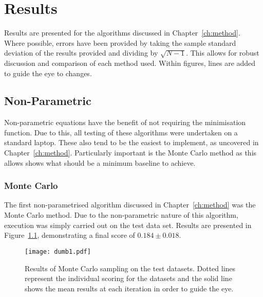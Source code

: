 \chapter{Results}










\graphicspath{{Chapter4/Figs/Vector/}{Chapter4/Figs/}}
Results are presented for the algorithms discussed in Chapter~\ref{ch:method}. Where possible, errors have been provided by taking the sample standard deviation of the results provided and dividing by $\sqrt{N-1}$. This allows for robust discussion and comparison of each method used. Within figures, lines are added to guide the eye to changes.

\section{Non-Parametric}
Non-parametric equations have the benefit of not requiring the minimisation function. Due to this, all testing of these algorithms were undertaken on a standard laptop. These also tend to be the easiest to implement, as uncovered in Chapter~\ref{ch:method}. Particularly important is the Monte Carlo method as this allows shows what should be a minimum baseline to achieve.

\subsection{Monte Carlo}
The first non-parametrised algorithm discussed in Chapter~\ref{ch:method} was the Monte Carlo method. Due to the non-parametric nature of this algorithm, execution was simply carried out on the test data set. Results are presented in Figure~\ref{fig:MCTestSet}, demonstrating a final score of ${0.184\pm{}0.018}$.

\begin{figure}[H]
    \begin{center}
        \texttt{[image: dumb1.pdf]}
        \caption[Monte Carlo]{Results of Monte Carlo sampling on the test datasets. Dotted lines represent the individual scoring for the datasets and the solid line shows the mean results at each iteration in order to guide the eye.}
        \label{fig:MCTestSet}
    \end{center}
\end{figure}

